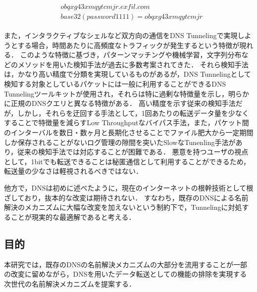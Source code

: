 \begin{eqnarray}
 \label{eq:sample_qname}
 \begin{aligned}
  &obqxg43xmqytcmjr.exfil.com\\
  &base32(password1111) = obqxg43xmqytcmjr
 \end{aligned}
\end{eqnarray}

また，インタラクティブなシェルなど双方向の通信をDNS Tunnelingで実現しようとする場合，時間あたりに高頻度なトラフィックが発生するという特徴が現れる．
このような特徴に基づき，パターンマッチングや機械学習，文字列分布などのメソッドを用いた検知手法が過去に多数考案されてきた\cite{born, cheng, liu, asaf, steadman, jawad}．
それら検知手法は，かなり高い精度で分類を実現しているものがあるが，DNS Tunnelingとして検知する対象としているパケットには一般に利用することができるDNS Tunnelingツールキット\cite{ozymandns, iodine, dnscat2}が使用され，それらは特に過剰な特徴量を示し，明らかに正規のDNSクエリと異なる特徴がある．
高い精度を示す従来の検知手法だが，しかし，それらを迂回する手法として，1回あたりの転送データ量を少なくすることで特徴量を減らすLow Throughputなバイパス手法，また，パケット間のインターバルを数日・数ヶ月と長期化させることでファイル肥大から一定期間しか保存されることがないログ管理の隙間を突いたSlowなTunenling手法があり，従来の検知手法では対応することが困難である．
悪意を持つユーザの視点として，1bitでも転送できることは秘匿通信として利用することができるため，転送量の少なさは軽視されるべきではない．

他方で，DNSは初めに述べたように，現在のインターネットの根幹技術として根ざしており，抜本的な改変は期待されない．
すなわち，既存のDNSによる名前解決のメカニズムに大幅な改変を加えないという制約下で，Tunnelingに対処することが現実的な最適解であると考える．


\subsection{目的}
本研究では，既存のDNSの名前解決メカニズムの大部分を流用することが一部の改変に留めながら，DNSを用いたデータ転送としての機能の排除を実現する次世代の名前解決メカニズムを提案する．




